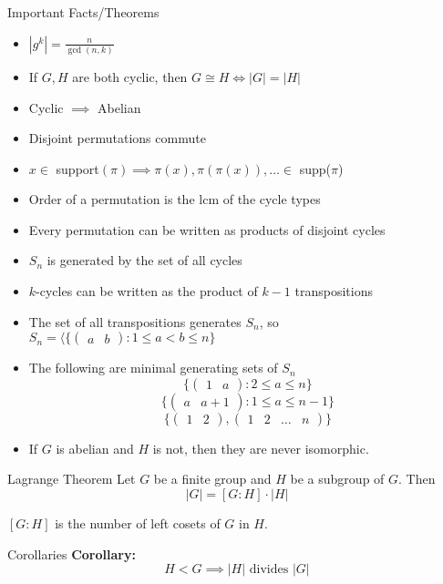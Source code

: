 \documentclass{article}
\begin{document}
\begin{multicols*}{3}
\begin{blackbox}{Important Facts/Theorems}
\begin{itemize}
        \item $|g^k| = \frac{n}{\gcd(n,k)}$
        \item If $G,H$ are both cyclic, then $G \cong H \iff |G| = |H|$
        \item Cyclic $\implies$ Abelian
        \item Disjoint permutations commute
        \item $x \in $ support$(\pi) \implies \pi(x), \pi(\pi(x)), \ldots \in$ supp($\pi$)
        \item Order of a permutation is the lcm of the cycle types
        \item Every permutation can be written as products of disjoint cycles
        \item $S_n$ is generated by the set of all cycles
        \item $k$-cycles can be written as the product of $k - 1$ transpositions
        \item The set of all transpositions generates $S_n$, so $S_n = \langle \{\begin{pmatrix}
            a & b
        \end{pmatrix}: 1 \leq a < b \leq n\}$
        \item The following are minimal generating sets of $S_n$
        \[\{\begin{pmatrix}
            1 & a
        \end{pmatrix}: 2 \leq a \leq n\}\]
        \[\{\begin{pmatrix}
            a & a+1
        \end{pmatrix}: 1 \leq a \leq n-1\}\]
        \[\{\begin{pmatrix}
            1 & 2
        \end{pmatrix}, \begin{pmatrix}
            1 & 2 & \ldots & n
        \end{pmatrix}\}\]
        \item If $G$ is abelian and $H$ is not, then they are never isomorphic.
    \end{itemize}
\end{blackbox}
\begin{blackbox}{Lagrange Theorem}
    Let $G$ be a finite group and $H$ be a subgroup of $G$. Then\\[-2ex]
    \[|G| = [G : H] \cdot |H|\]
    \raggedright
    $[G:H]$ is the number of left cosets of $G$ in $H$.
    \begin{bluebox}{Corollaries}
        \textbf{Corollary:}\\[-2ex]
        \[H <  G \implies |H| \text{ divides } |G|\]


\end{bluebox}
\end{blackbox}
\end{multicols*}
\end{document}
